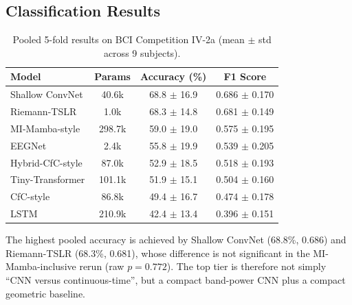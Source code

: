 \documentclass[journal]{IEEEtran}
\begin{document}
\subsection{Classification Results}
\begin{table}[t]
  \centering
  \footnotesize
  \caption{Pooled 5-fold results on BCI Competition IV-2a (mean $\pm$ std across 9 subjects).}
  \begin{tabular}{lccc}
    \toprule
    \textbf{Model} & \textbf{Params} & \textbf{Accuracy (\%)} & \textbf{F1 Score} \\
    \midrule
    Shallow ConvNet \cite{schirrmeister2017deep} & 40.6k & 68.8 $\pm$ 16.9 & 0.686 $\pm$ 0.170 \\
    Riemann-TSLR & 1.0k & 68.3 $\pm$ 14.8 & 0.681 $\pm$ 0.149 \\
    MI-Mamba-style & 298.7k & 59.0 $\pm$ 19.0 & 0.575 $\pm$ 0.195 \\
    EEGNet \cite{lawhern2018eegnet} & 2.4k & 55.8 $\pm$ 19.9 & 0.539 $\pm$ 0.205 \\
    Hybrid-CfC-style & 87.0k & 52.9 $\pm$ 18.5 & 0.518 $\pm$ 0.193 \\
    Tiny-Transformer & 101.1k & 51.9 $\pm$ 15.1 & 0.504 $\pm$ 0.160 \\
    CfC-style & 86.8k & 49.4 $\pm$ 16.7 & 0.474 $\pm$ 0.178 \\
    LSTM \cite{hochreiter1997long} & 210.9k & 42.4 $\pm$ 13.4 & 0.396 $\pm$ 0.151 \\
    \bottomrule
  \end{tabular}
  \label{tab:results}
\end{table}

The highest pooled accuracy is achieved by Shallow ConvNet (68.8\%, 0.686) and Riemann-TSLR (68.3\%, 0.681), whose difference is not significant in the MI-Mamba-inclusive rerun (raw $p = 0.772$). The top tier is therefore not simply ``CNN versus continuous-time'', but a compact band-power CNN plus a compact geometric baseline.
\end{document}
